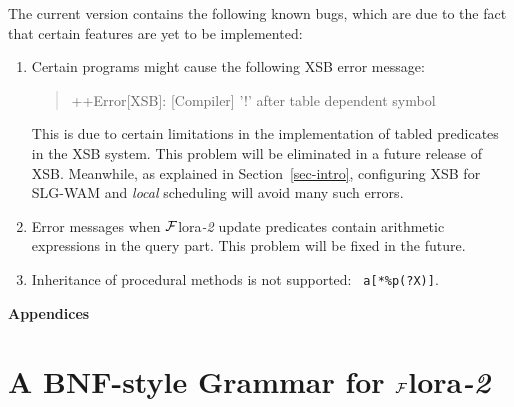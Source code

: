 \documentclass[11pt]{article}
\newcommand{\FLORA}{{\mbox{\sc ${\cal F}${lora}\rm\emph{-2}}}\xspace}
\begin{document}
The current version contains the following known bugs, which are due to the
fact that certain features are yet to be implemented:
\begin{enumerate}
  \item  Certain programs might cause the following XSB error message:
    \begin{quote}
     ++Error[XSB]: [Compiler] '!' after table dependent symbol 
    \end{quote}
    This is due to certain limitations in the implementation of tabled
    predicates in the XSB system. This problem will be eliminated in a
    future release of XSB. Meanwhile, as explained in
    Section~\ref{sec-intro},
    configuring XSB for SLG-WAM and \emph{local} scheduling will avoid many
    such errors.
  \item Error messages when \FLORA update predicates contain arithmetic
    expressions in the query part. This problem will be fixed in the
    future.
  \item Inheritance of procedural methods is not supported: {\tt
      a[*\%p(?X)]}.
\end{enumerate}


\appendix

\newpage

\noindent
{\LARGE\bf Appendices}

\section{A BNF-style Grammar for \FLORA}\label{app-bnf}
\end{document}
